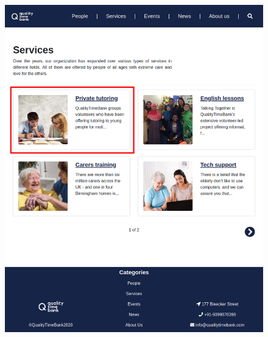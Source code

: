 \documentclass[a4paper, 11pt, parskip=half, headsepline]{scrreprt}
\begin{document}
\begin{figure}[H]
\begin{minipage}[t]{0.5\textwidth}
    	\caption{}
    	\label{fig:scenario-11}
    \end{minipage}
    \hspace*{\fill}
    \begin{minipage}[t]{0.5\textwidth}
        \centering
    	\includegraphics[width=1\linewidth, keepaspectratio]{scenarios/scenario-12}
    	\caption{}
    	\label{fig:scenario-12}
    \end{minipage}
\end{figure}
\end{document}
